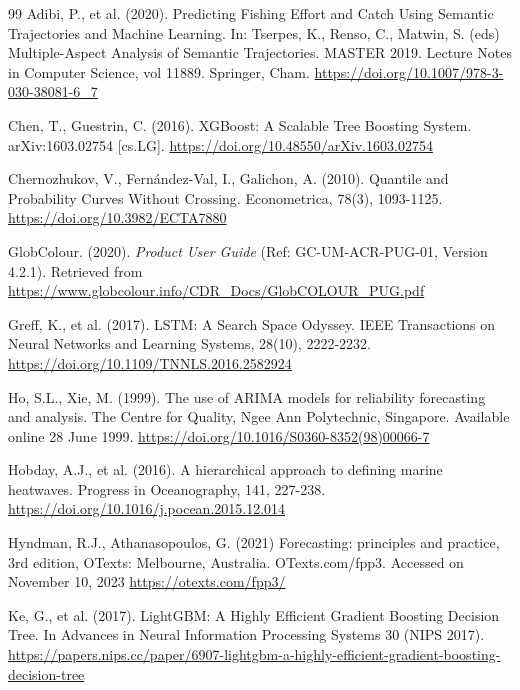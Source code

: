 \begin{thebibliography}{99}
Adibi, P., et al. (2020). Predicting Fishing Effort and Catch Using Semantic Trajectories and Machine Learning. In: Tserpes, K., Renso, C., Matwin, S. (eds) Multiple-Aspect Analysis of Semantic Trajectories. MASTER 2019. Lecture Notes in Computer Science, vol 11889. Springer, Cham. \url{https://doi.org/10.1007/978-3-030-38081-6_7}

Chen, T., Guestrin, C. (2016). XGBoost: A Scalable Tree Boosting System. arXiv:1603.02754 [cs.LG]. \url{https://doi.org/10.48550/arXiv.1603.02754}

Chernozhukov, V., Fernández-Val, I., Galichon, A. (2010). Quantile and Probability Curves Without Crossing. Econometrica, 78(3), 1093-1125. \url{https://doi.org/10.3982/ECTA7880}

GlobColour. (2020). \emph{Product User Guide} (Ref: GC-UM-ACR-PUG-01, Version 4.2.1). Retrieved from \url{https://www.globcolour.info/CDR_Docs/GlobCOLOUR_PUG.pdf}

Greff, K., et al. (2017). LSTM: A Search Space Odyssey. IEEE Transactions on Neural Networks and Learning Systems, 28(10), 2222-2232. \url{https://doi.org/10.1109/TNNLS.2016.2582924}

Ho, S.L., Xie, M. (1999). The use of ARIMA models for reliability forecasting and analysis. The Centre for Quality, Ngee Ann Polytechnic, Singapore. Available online 28 June 1999. \url{https://doi.org/10.1016/S0360-8352(98)00066-7}

Hobday, A.J., et al. (2016). A hierarchical approach to defining marine heatwaves. Progress in Oceanography, 141, 227-238. \url{https://doi.org/10.1016/j.pocean.2015.12.014}

Hyndman, R.J., Athanasopoulos, G. (2021) Forecasting: principles and practice, 3rd edition, OTexts: Melbourne, Australia. OTexts.com/fpp3. Accessed on November 10, 2023 \url{https://otexts.com/fpp3/}

Ke, G., et al. (2017). LightGBM: A Highly Efficient Gradient Boosting Decision Tree. In Advances in Neural Information Processing Systems 30 (NIPS 2017). \url{https://papers.nips.cc/paper/6907-lightgbm-a-highly-efficient-gradient-boosting-decision-tree}


\end{thebibliography}
